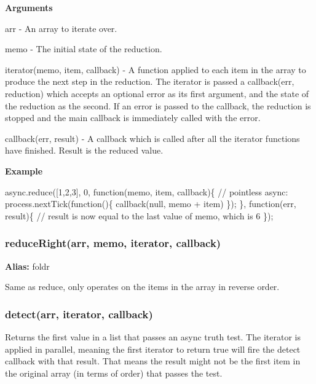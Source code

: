 {\bfseries Arguments}


\begin{DoxyItemize}
\item arr -\/ An array to iterate over.
\item memo -\/ The initial state of the reduction.
\item iterator(memo, item, callback) -\/ A function applied to each item in the array to produce the next step in the reduction. The iterator is passed a callback(err, reduction) which accepts an optional error as its first argument, and the state of the reduction as the second. If an error is passed to the callback, the reduction is stopped and the main callback is immediately called with the error.
\item callback(err, result) -\/ A callback which is called after all the iterator functions have finished. Result is the reduced value.
\end{DoxyItemize}

{\bfseries Example}


\begin{DoxyCode}
async.reduce([1,2,3], 0, \textcolor{keyword}{function}(memo, item, callback)\{
    \textcolor{comment}{// pointless async:}
    process.nextTick(\textcolor{keyword}{function}()\{
        callback(null, memo + item)
    \});
\}, \textcolor{keyword}{function}(err, result)\{
    \textcolor{comment}{// result is now equal to the last value of memo, which is 6}
\});
\end{DoxyCode}
 



\label{_reduceRight}%
 \subsubsection*{reduce\+Right(arr, memo, iterator, callback)}

{\bfseries Alias\+:} foldr

Same as reduce, only operates on the items in the array in reverse order.





\label{_detect}%
 \subsubsection*{detect(arr, iterator, callback)}

Returns the first value in a list that passes an async truth test. The iterator is applied in parallel, meaning the first iterator to return true will fire the detect callback with that result. That means the result might not be the first item in the original array (in terms of order) that passes the test.

